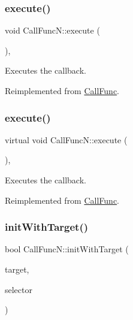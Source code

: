 \subsubsection{\texorpdfstring{execute()}{execute()}\hspace{0.1cm}{\footnotesize\ttfamily [1/2]}}
{\footnotesize\ttfamily void Call\+Func\+N\+::execute (\begin{DoxyParamCaption}{ }\end{DoxyParamCaption})\hspace{0.3cm}{\ttfamily [override]}, {\ttfamily [virtual]}}

Executes the callback. 

Reimplemented from \hyperlink{classCallFunc_a9a66dcb09103983ddab2ee2c89ae5c0e}{Call\+Func}.

\mbox{\label{classCallFuncN_a072d0dabb4a2d7d211d164fedd79c47a}} 
\subsubsection{\texorpdfstring{execute()}{execute()}\hspace{0.1cm}{\footnotesize\ttfamily [2/2]}}
{\footnotesize\ttfamily virtual void Call\+Func\+N\+::execute (\begin{DoxyParamCaption}{ }\end{DoxyParamCaption})\hspace{0.3cm}{\ttfamily [override]}, {\ttfamily [virtual]}}

Executes the callback. 

Reimplemented from \hyperlink{classCallFunc_a9a66dcb09103983ddab2ee2c89ae5c0e}{Call\+Func}.

\mbox{\label{classCallFuncN_a6f2f7343dc7aa74035dbf89c45a4e2f3}} 
\subsubsection{\texorpdfstring{init\+With\+Target()}{initWithTarget()}\hspace{0.1cm}{\footnotesize\ttfamily [1/2]}}
{\footnotesize\ttfamily bool Call\+Func\+N\+::init\+With\+Target (\begin{DoxyParamCaption}\item[{\hyperlink{classRef}{Ref} $\ast$}]{target,  }\item[{S\+E\+L\+\_\+\+Call\+FuncN}]{selector }\end{DoxyParamCaption})}

